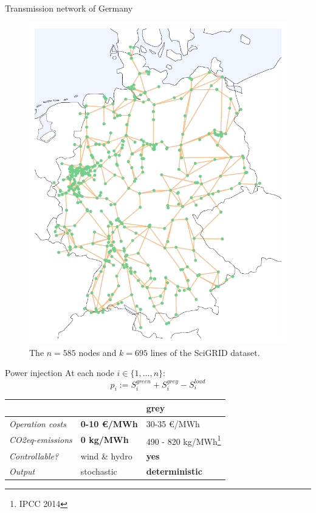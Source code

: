 \documentclass[10pt]{beamer}
\newcommand{\mel}[1]{\ensuremath{{{#1}}}}
\begin{document}
\begin{frame}{Transmission network of Germany}
    \begin{figure}
    \includegraphics[height=.69\paperheight]{img/just_the_network.pdf}
    \caption{The $n=585$ nodes and $k=695$ lines of the SciGRID dataset.}
    \end{figure}
\end{frame}

\begin{frame}{Power injection}
    At each node $i\in\{1,\dots,n\}$:
    \[\mel{p}_i := S^{green}_i + S^{grey}_i - S^{load}_i\]
    \begin{table}[]
\begin{tabular}{l|ll}
\toprule
                         & \color{renewablegreen}{\textbf{green}} & \textbf{\textbf{grey}} \\
                         \midrule
\emph{Operation costs} & \textbf{0-10 €/MWh}       & 30-35 €/MWh      \\
\emph{CO2eq-emissions} & \textbf{0 kg/MWh}          & 490 - 820 kg/MWh\footnote{IPCC 2014} \\
\emph{Controllable?}   & wind \& hydro               & \textbf{yes}             \\
\emph{Output}          & stochastic       & \textbf{deterministic}\\
\bottomrule
\end{tabular}
\end{table}
\end{frame}
\end{document}
